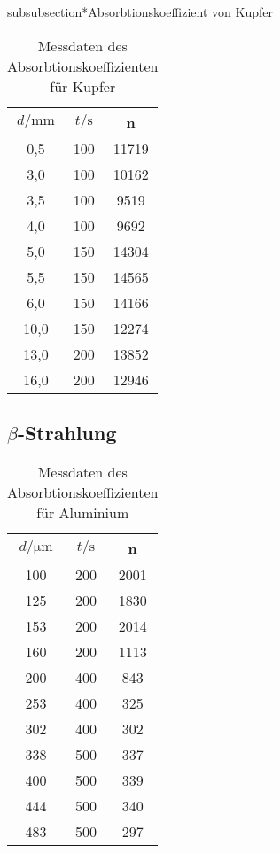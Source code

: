 subsubsection*{Absorbtionskoeffizient von Kupfer}

\begin{table}
    \center
    \begin{tabular}{c c c}
        \toprule
        $d / \unit{\milli\meter}$ &  $t / \unit\second$ &     n \\
        \midrule
            0,5 &    100 & 11719 \\
            3,0 &    100 & 10162 \\
            3,5 &    100 &  9519 \\
            4,0 &    100 &  9692 \\
            5,0 &    150 & 14304 \\
            5,5 &    150 & 14565 \\
            6,0 &    150 & 14166 \\
           10,0 &    150 & 12274 \\
           13,0 &    200 & 13852 \\
           16,0 &    200 & 12946 \\
        \bottomrule
    \end{tabular}
    \caption{Messdaten des Absorbtionskoeffizienten für Kupfer}
    \label{tab:md2kupfer}
\end{table}

\subsection[Beta-Strahlung]{$\beta$-Strahlung}

\begin{table}
    \center
    \begin{tabular}{c c c}
        \toprule
        $d / \unit{\micro\meter}$ &  $t / \unit\second$ &     n \\
        \midrule
                100 &    200 & 2001 \\
                125 &    200 & 1830 \\
                153 &    200 & 2014 \\
                160 &    200 & 1113 \\
                200 &    400 &  843 \\
                253 &    400 &  325 \\
                302 &    400 &  302 \\
                338 &    500 &  337 \\
                400 &    500 &  339 \\
                444 &    500 &  340 \\
                483 &    500 &  297 \\
        \bottomrule
    \end{tabular}
    \caption{Messdaten des Absorbtionskoeffizienten für Aluminium}
    \label{tab:md3alu}
\end{table}
